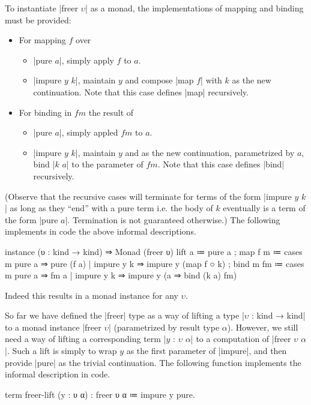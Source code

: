 To instantiate \code|freer $υ$| as a monad, the implementations of mapping and binding must be provided:
\begin{itemize}
  \item For mapping $f$ over
  \begin{itemize}
    \item \code|pure $a$|, simply apply $f$ to $a$.
    \item \code|impure $y$ $k$|, maintain $y$ and compose \code|map $f$| with $k$ as the new continuation.
        Note that this case defines \code|map| recursively.
  \end{itemize}

  \item For binding in $fm$ the result of
  \begin{itemize}
    \item \code|pure $a$|, simply appled $fm$ to $a$.
    \item \code|impure $y$ $k$|, maintain $y$ and as the new continuation, parametrized by $a$, bind \code|$k$ $a$| to the parameter of $fm$.
        Note that this case defines \code|bind| recursively.
  \end{itemize}
\end{itemize}
(Observe that the recursive cases will terminate for terms of the form \code|impure $y$ $k$| as long as they ``end'' with a pure term i.e. the body of $k$ eventually is a term of the form \code|pure $a$|.
Termination is not guaranteed otherwise.)
The following implements in code the above informal descriptions.
\begin{program}[caption={Monad instance of \code|freer|}]
instance (υ : kind → kind) ⇒ Monad (freer υ)
  { lift   a  ≔ pure a
  ; map  f m  ≔ cases m
                  { pure   a   ⇒ pure (f a)
                  | impure y k ⇒ impure y (map f ○ k) }
  ; bind m fm ≔ cases m
                  { pure   a   ⇒ fm a
                  | impure y k ⇒ impure y (a ⇒ bind (k a) fm) } }
\end{program}
Indeed this results in a monad instance for any $υ$.

So far we have defined the \code|freer| type as a way of lifting a type \code|$υ$ : kind → kind| to a monad instance \code|freer $υ$| (parametrized by result type $α$).
However, we still need a way of lifting a corresponding term \code|$y$ : $υ$ $α$| to a computation of \code|freer $υ$ $α$|.
Such a lift is simply to wrap $y$ as the first parameter of \code|impure|, and then provide \code|pure| as the trivial continuation.
The following function implements the informal description in code.
\begin{program}
term freer-lift (y : υ α) : freer υ α ≔ impure y pure.
\end{program}

